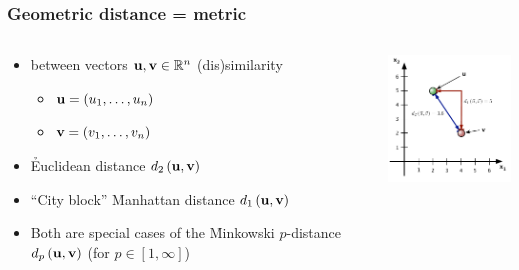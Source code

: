 \documentclass[t]{beamer} %
\begin{document}

\begin{frame}
  \frametitle{Geometric distance = metric}

  \begin{columns}[T]
    \begin{column}{60mm}
      \begin{itemize}
      \item {} between vectors $\vu, \vv \in \setR^n$ \so
        (dis)similarity
        \begin{itemize}
        \item $\vu = (u_1, \ldots, u_n)$
        \item $\vv = (v_1, \ldots, v_n)$
        \end{itemize}
      \item<2-> \h{Euclidean} distance $\dist[2]{\vu}{\vv}$
      \item<3-> ``City block'' \h{Manhattan} distance $\dist[1]{\vu}{\vv}$
      \item<4-> Both are special cases of the \h{Minkowski} $p$-distance
        $\dist[p]{\vu}{\vv}$ (for $p\in [1, \infty]$)
      \end{itemize}
    \end{column}
    \begin{column}{45mm}
      \includegraphics[width=45mm]{img/2_distance_examples}
    \end{column}
  \end{columns}
  \gap[.5]
\end{frame}
\end{document}
